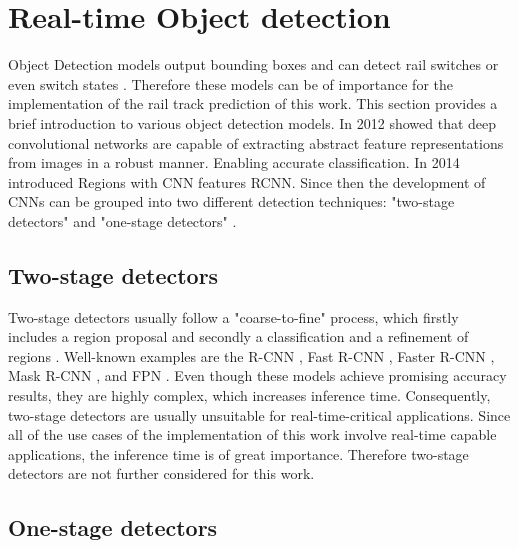 \section{Real-time Object detection}
\label{sec:ObjectDetection}

Object Detection models output bounding boxes and can detect rail switches or even switch states \cite{railsem19dataset}.
Therefore these models can be of importance for the implementation of the rail track prediction of this work.
This section provides a brief introduction to various object detection models.
In 2012 \cite{AlexNet2012} showed that deep convolutional networks are capable of extracting abstract feature representations from images in a robust manner.
Enabling accurate classification.
In 2014 \cite{RCNN2014} introduced Regions with CNN features \ac{RCNN}.
Since then the development of \ac{CNN}s can be grouped into two different detection techniques: "two-stage detectors" and "one-stage detectors" \cite{20yearsSurvey, surveyObjectDetection, surveyObjectDetection2019}.

\subsection{Two-stage detectors}

Two-stage detectors usually follow a "coarse-to-fine" process, which firstly includes a region proposal and secondly a classification and a refinement of regions \cite{20yearsSurvey, surveyObjectDetection, surveyObjectDetection2019, twostageObjectDetection}.
Well-known examples are the R-CNN \cite{RCNN2014}, Fast R-CNN \cite{FastRCNN2015}, Faster R-CNN \cite{FasterRCNN2017}, Mask R-CNN \cite{MaskRCNN2017}, and \ac{FPN} \cite{FPN2017_two_stage-detector}.
Even though these models achieve promising accuracy results, they are highly complex, which increases inference time.
Consequently, two-stage detectors are usually unsuitable for real-time-critical applications.
Since all of the use cases of the implementation of this work involve real-time capable applications, the inference time is of great importance.
Therefore two-stage detectors are not further considered for this work.

\subsection{One-stage detectors}

